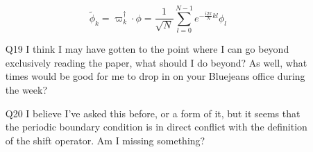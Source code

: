 \begin{description}
\begin{itemize}
$$\tilde{\phi}_k=\varpi^{\dagger}_k\cdot\phi=\frac{1}{\sqrt{N}}\sum^{N-1}_{l=0}e^{-\frac{i2\pi}{N}kl}\phi_l$$

\item[Q19]
I think I may have gotten to the point where I can go beyond exclusively reading the paper, what should I do beyond? As well, what times would be good for me to drop in on your Bluejeans office during the week?

\item[Q20]
I believe I've asked this before, or a form of it, but it seems that the periodic boundary condition is in direct conflict with the definition of the shift operator. Am I missing something?
\end{itemize} 



\end{description}
